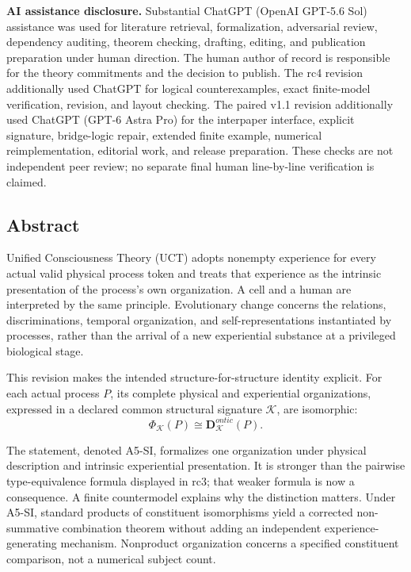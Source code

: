 \documentclass[
  11pt,
  a4paper,
]{article}
\begin{document}
\textbf{AI assistance disclosure.} Substantial ChatGPT (OpenAI GPT-5.6
Sol) assistance was used for literature retrieval, formalization,
adversarial review, dependency auditing, theorem checking, drafting,
editing, and publication preparation under human direction. The human
author of record is responsible for the theory commitments and the
decision to publish. The rc4 revision additionally used ChatGPT for
logical counterexamples, exact finite-model verification, revision, and
layout checking. The paired v1.1 revision additionally used ChatGPT
(GPT-6 Astra Pro) for the interpaper interface, explicit signature,
bridge-logic repair, extended finite example, numerical
reimplementation, editorial work, and release preparation. These checks
are not independent peer review; no separate final human line-by-line
verification is claimed.

\hypertarget{abstract}{%
\subsection{Abstract}\label{abstract}}

Unified Consciousness Theory (UCT) adopts nonempty experience for every
actual valid physical process token and treats that experience as the
intrinsic presentation of the process's own organization. A cell and a
human are interpreted by the same principle. Evolutionary change
concerns the relations, discriminations, temporal organization, and
self-representations instantiated by processes, rather than the arrival
of a new experiential substance at a privileged biological stage.

This revision makes the intended structure-for-structure identity
explicit. For each actual process \(P\), its complete physical and
experiential organizations, expressed in a declared common structural
signature \(\mathcal K\), are isomorphic:
\nopagebreak[4]
\[
\Phi_{\mathcal K}(P)\cong\mathbf D^{ontic}_{\mathcal K}(P).
\]

The statement, denoted A5-SI, formalizes one organization under physical
description and intrinsic experiential presentation. It is stronger than
the pairwise type-equivalence formula displayed in rc3; that weaker
formula is now a consequence. A finite countermodel explains why the
distinction matters. Under A5-SI, standard products of constituent
isomorphisms yield a corrected non-summative combination theorem without
adding an independent experience-generating mechanism. Nonproduct
organization concerns a specified constituent comparison, not a
numerical subject count.
\end{document}
